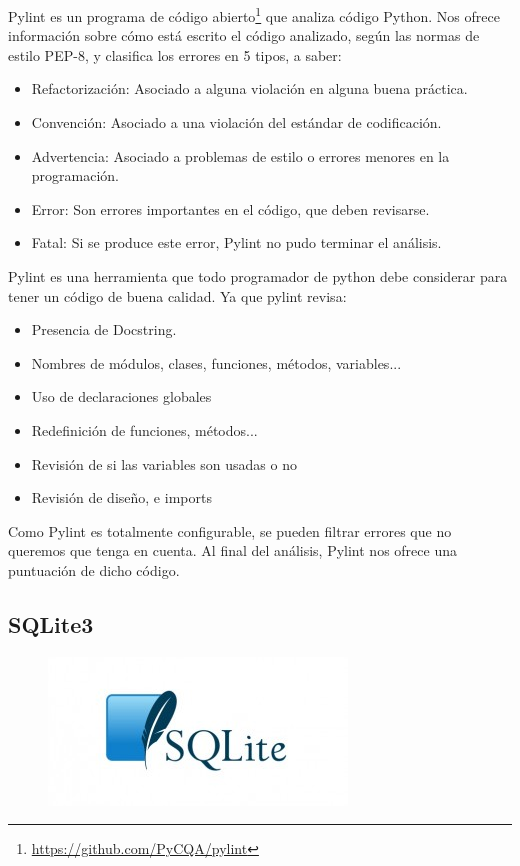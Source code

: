 \documentclass[a4paper, 12pt]{book}
\begin{document}
Pylint es un programa de código abierto\footnote{\url{https://github.com/PyCQA/pylint}} que analiza código Python. Nos ofrece información sobre cómo está escrito el código analizado, según las normas de estilo PEP-8, y clasifica los errores en 5 tipos, a saber:
\begin{itemize}
\item Refactorización: Asociado a alguna violación en alguna buena práctica.
\item Convención: Asociado a una violación del estándar de codificación.
\item Advertencia: Asociado a problemas de estilo o errores menores en la programación.
\item Error: Son errores importantes en el código, que deben revisarse.
\item Fatal: Si se produce este error, Pylint no pudo terminar el análisis.
\end{itemize}
Pylint es una herramienta que todo programador de python debe considerar para tener un código de buena calidad. Ya que pylint revisa:
\begin{itemize}
\item Presencia de Docstring.
\item Nombres de módulos, clases, funciones, métodos, variables...
\item Uso de declaraciones globales
\item Redefinición de funciones, métodos...
\item Revisión de si las variables son usadas o no
\item Revisión de diseño, e imports
\end{itemize}
Como Pylint es totalmente configurable, se pueden filtrar errores que no queremos que tenga en cuenta.
Al final del análisis, Pylint nos ofrece una puntuación de dicho código.

\subsection{SQLite3}
\begin{figure}[hbtp]
\centering
\includegraphics[scale=0.8]{img/sqlite3.jpg} 
\end{figure}
\end{document}
